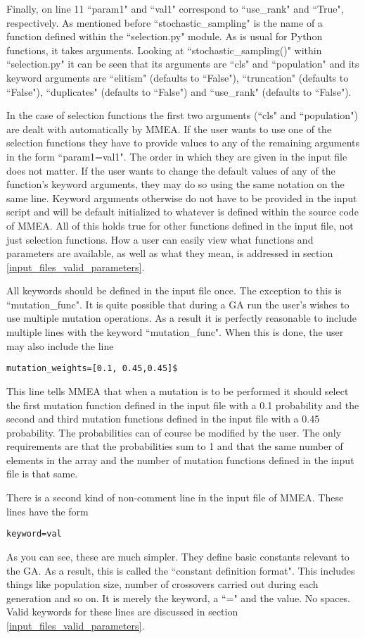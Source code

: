 \documentclass{article}
\begin{document}
Finally, on line 11 ``param1" and ``val1" correspond to ``use\_rank" and ``True", respectively. As mentioned before ``stochastic\_sampling" is the name of a function defined within the ``selection.py" module. As is usual for Python functions, it takes arguments. Looking at ``stochastic\_sampling()" within ``selection.py" it can be seen that its arguments are ``cls" and ``population" and its keyword arguments are ``elitism" (defaults to ``False"), ``truncation" (defaults to ``False"), ``duplicates" (defaults to ``False") and ``use\_rank" (defaults to ``False").

In the case of selection functions the first two arguments (``cls" and ``population") are dealt with automatically by MMEA. If the user wants to use one of the selection functions they have to provide values to any of the remaining arguments in the form ``param1=val1". The order in which they are given in the input file does not matter. If the user wants to change the default values of any of the function's keyword arguments, they may do so using the same notation on the same line. Keyword arguments otherwise do not have to be provided in the input script and will be default initialized to whatever is defined within the source code of MMEA. All of this holds true for other functions defined in the input file, not just selection functions. How a user can easily view what functions and parameters are available, as well as what they mean, is addressed in section \ref{input_files_valid_parameters}.

All keywords should be defined in the input file once. The exception to this is ``mutation\_func". It is quite possible that during a GA run the user's wishes to use multiple mutation operations. As a result it is perfectly reasonable to include multiple lines with the keyword  ``mutation\_func". When this is done, the user may also include the line 
\begin{verbatim}
mutation_weights=[0.1, 0.45,0.45]$
\end{verbatim}
This line tells MMEA that when a mutation is to be performed it should select the first mutation function defined in the input file with a 0.1 probability and the second and third mutation functions defined in the input file with a 0.45 probability. The probabilities can of course be modified by the user. The only requirements are that the probabilities sum to 1 and that the same number of elements in the array and the number of mutation functions defined in the input file is that same.

There is a second kind of non-comment line in the input file of MMEA. These lines have the form
\begin{verbatim}
keyword=val
\end{verbatim}
As you can see, these are much simpler. They define basic constants relevant to the GA. As a result, this is called the ``constant definition format". This includes things like population size, number of crossovers carried out during each generation and so on. It is merely the keyword, a ``=" and the value. No spaces. Valid keywords for these lines are discussed in section \ref{input_files_valid_parameters}.
\end{document}
